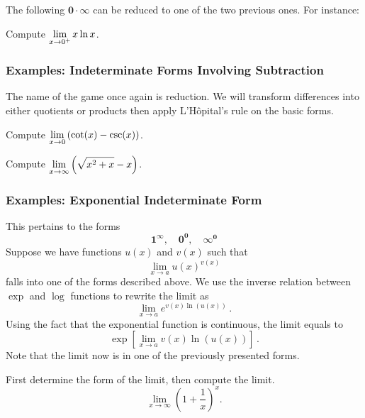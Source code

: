 \documentclass[10pt,t,handout,ignorenonframetext,aspectratio=169]{beamer}
\begin{document}
\begin{frame}
  \vs The following $\boldsymbol{0 \cdot \infty}$ can be reduced to one of the
  two previous ones. For instance: \\
  \begin{question}
    Compute $\displaystyle \lim_{x\to 0^+} x\ln x$.
  \end{question}
\end{frame}

\begin{frame}
  \frametitle{Examples: Indeterminate Forms Involving Subtraction}

  The name of the game once again is reduction. We will transform
  differences into either quotients or products then apply
  L'H\^{o}pital's rule on the basic forms. \\

  \begin{question}
    Compute $\displaystyle \lim_{x\to 0} \left(\cot(x) - \csc(x)\right)$.
  \end{question}
\end{frame}

\begin{frame}
  \vs
  \begin{question}
    Compute $\displaystyle \lim_{x\to\infty}\left(\sqrt{x^2+x}-x\right)$.
  \end{question}
\end{frame}

\begin{frame}
  \frametitle{Examples: Exponential Indeterminate Form}
  This pertains to the forms
  \[
    \boldsymbol{1^\infty}, \quad \boldsymbol{0^0}, \quad \boldsymbol{\infty^0}
  \]
  Suppose we have functions $u(x)$ and $v(x)$ such that
  \[
    \lim_{x \to a} u(x)^{v(x)}
  \]
  falls into one of the forms described above. We use the inverse relation between $\exp$ and $\log$ functions to rewrite the limit as
  \[
    \lim_{x\to a}e^{v(x) \ln(u(x))} \,.
  \]
  Using the fact that the exponential function is continuous, the limit equals to
  \[
    \exp[ \lim_{x\to a} v(x) \ln (u(x)) ] \,.
  \]
  Note that the limit now is in one of the previously presented forms.
\end{frame}

\begin{frame}
  \vs

  \begin{question}
    First determine the form of the limit, then compute the limit.
    \[
      \lim_{x\to \infty}\left(1 + \frac{1}{x}\right)^x.
    \]
  \end{question}
\end{frame}
\end{document}
